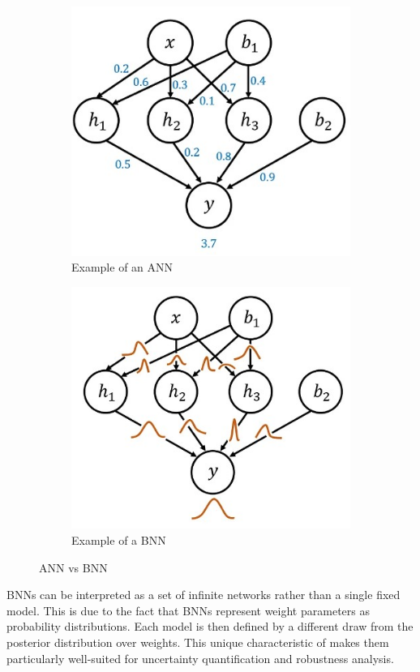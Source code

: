 \begin{figure}[h]
	\centering
	\begin{subfigure}{.5\textwidth}
		\centering
		\includegraphics[width=0.8\linewidth]{ImageFiles/BayesianNeuralNetworks/ANN}
		\caption{Example of an ANN}
		\label{fig:ann}
	\end{subfigure}%
	\begin{subfigure}{.5\textwidth}
		\centering
		\includegraphics[width=0.8\linewidth]{ImageFiles/BayesianNeuralNetworks/BNN}
		\caption{Example of a BNN}
		\label{fig:bnn}
	\end{subfigure}
	\caption{ANN vs BNN \cite{WYSUBNN}}
	\label{fig:annvsbnn}
\end{figure}

BNNs can be interpreted as a set of infinite networks rather than a single fixed model. This is due to the fact that BNNs represent weight parameters as probability distributions. Each model is then defined by a different draw from the posterior distribution over weights. This unique characteristic of makes them particularly well-suited for uncertainty quantification and robustness analysis. 


